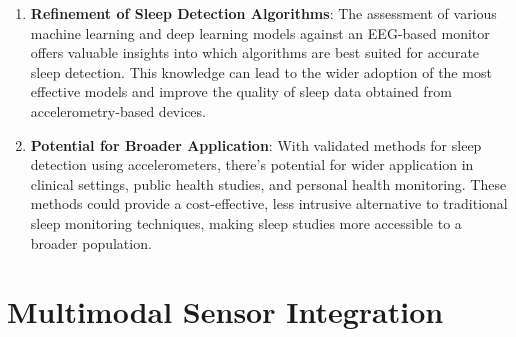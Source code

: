 \documentclass[
  10pt,
]{scrbook}
\let\originaltextbf\textbf
\renewcommand{\textbf}[1]{\textcolor{color1}{\originaltextbf{#1}}}
\begin{document}
\begin{enumerate}
\def\labelenumi{\arabic{enumi}.}
\item
  \textbf{Refinement of Sleep Detection Algorithms}: The assessment of
  various machine learning and deep learning models against an EEG-based
  monitor offers valuable insights into which algorithms are best suited
  for accurate sleep detection. This knowledge can lead to the wider
  adoption of the most effective models and improve the quality of sleep
  data obtained from accelerometry-based devices.
\item
  \textbf{Potential for Broader Application}: With validated methods for
  sleep detection using accelerometers, there's potential for wider
  application in clinical settings, public health studies, and personal
  health monitoring. These methods could provide a cost-effective, less
  intrusive alternative to traditional sleep monitoring techniques,
  making sleep studies more accessible to a broader population.
\end{enumerate}

\hypertarget{multimodal-sensor-integration}{%
\section{Multimodal Sensor
Integration}\label{multimodal-sensor-integration}}
\end{document}
